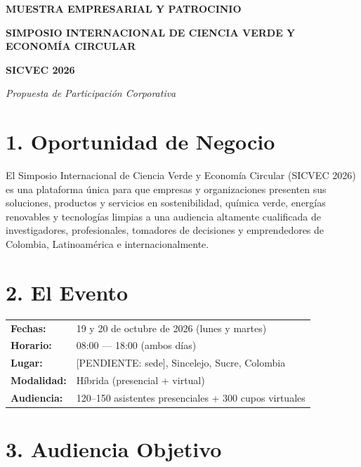 \documentclass[11pt,a4paper]{article}
\begin{document}
\vspace{0.3cm}

\begin{center}
\textbf{\Large MUESTRA EMPRESARIAL Y PATROCINIO}

\textbf{\large SIMPOSIO INTERNACIONAL DE CIENCIA VERDE Y ECONOMÍA CIRCULAR}

\textbf{SICVEC 2026}

\textit{Propuesta de Participación Corporativa}
\end{center}

\vspace{0.4cm}

\section*{1. Oportunidad de Negocio}

El Simposio Internacional de Ciencia Verde y Economía Circular (SICVEC 2026) es una plataforma única para que empresas y organizaciones presenten sus soluciones, productos y servicios en sostenibilidad, química verde, energías renovables y tecnologías limpias a una audiencia altamente cualificada de investigadores, profesionales, tomadores de decisiones y emprendedores de Colombia, Latinoamérica e internacionalmente.

\vspace{0.2cm}

\section*{2. El Evento}

\begin{tabular}{ll}
\textbf{Fechas:} & 19 y 20 de octubre de 2026 (lunes y martes) \\
\textbf{Horario:} & 08:00 — 18:00 (ambos días) \\
\textbf{Lugar:} & [PENDIENTE: sede], Sincelejo, Sucre, Colombia \\
\textbf{Modalidad:} & Híbrida (presencial + virtual) \\
\textbf{Audiencia:} & 120–150 asistentes presenciales + 300 cupos virtuales \\
\end{tabular}

\vspace{0.2cm}

\section*{3. Audiencia Objetivo}
\end{document}
